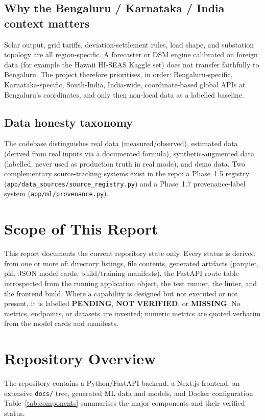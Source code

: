 \documentclass[11pt,a4paper]{article}
\newcommand{\stPend}{\textcolor{cpart}{\textbf{PENDING}}}
\newcommand{\stM}{\textcolor{cmiss}{\textbf{MISSING}}}
\newcommand{\stNV}{\textcolor{cnv}{\textbf{NOT VERIFIED}}}
\newcommand{\code}[1]{\texttt{\small #1}}
\begin{document}
\subsection{Why the Bengaluru / Karnataka / India context matters}
Solar output, grid tariffs, deviation-settlement rules, load shape, and substation
topology are all region-specific. A forecaster or DSM engine calibrated on foreign data
(for example the Hawaii HI-SEAS Kaggle set) does not transfer faithfully to Bengaluru.
The project therefore prioritises, in order: Bengaluru-specific, Karnataka-specific,
South-India, India-wide, coordinate-based global APIs at Bengaluru's coordinates, and
only then non-local data as a labelled baseline.

\subsection{Data honesty taxonomy}
The codebase distinguishes real data (measured/observed), estimated data (derived from
real inputs via a documented formula), synthetic-augmented data (labelled, never used as
production truth in real mode), and demo data. Two complementary source-tracking systems
exist in the repo: a Phase~1.5 registry (\code{app/data\_sources/source\_registry.py})
and a Phase~1.7 provenance-label system (\code{app/ml/provenance.py}).

\section{Scope of This Report}
This report documents the current repository state only. Every status is derived from one
or more of: directory listings, file contents, generated artifacts (parquet, pkl, JSON
model cards, build/training manifests), the FastAPI route table introspected from the
running application object, the test runner, the linter, and the frontend build. Where a
capability is designed but not executed or not present, it is labelled \stPend, \stNV, or
\stM. No metrics, endpoints, or datasets are invented; numeric metrics are quoted verbatim
from the model cards and manifests.

\section{Repository Overview}
The repository contains a Python/FastAPI backend, a Next.js frontend, an extensive
\code{docs/} tree, generated ML data and models, and Docker configuration.
Table~\ref{tab:components} summarises the major components and their verified status.
\end{document}

